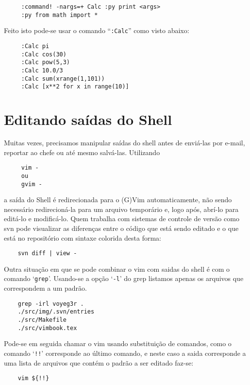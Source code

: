 \begin{verbatim}
     :command! -nargs=+ Calc :py print <args>
     :py from math import *
\end{verbatim}

Feito isto pode-se usar o comando ``{\tt :Calc}'' como visto abaixo:

\begin{verbatim}
     :Calc pi
     :Calc cos(30)
     :Calc pow(5,3)
     :Calc 10.0/3
     :Calc sum(xrange(1,101))
     :Calc [x**2 for x in range(10)] 
\end{verbatim}

\section{Editando saídas do Shell}
\label{sec:Editando saídas do Shell}

Muitas vezes, precisamos manipular saídas do shell antes de enviá-las por e-mail, reportar ao chefe ou até mesmo 
salvá-las. Utilizando

\begin{verbatim}
     vim -
     ou
     gvim -
\end{verbatim}

a saída do Shell é redirecionada para o (G)Vim automaticamente, não sendo
necessário redirecioná-la para um arquivo temporário e, logo após, abrí-lo para
editá-lo e modificá-lo. Quem trabalha com sistemas de controle de versão como svn 
pode visualizar as diferenças entre o código que está sendo editado e o que 
está no repositório com sintaxe colorida desta forma:

\begin{verbatim}
    svn diff | view -
\end{verbatim}

Outra situação em que se pode combinar o vim com saidas do shell é com o
comando `\verb|grep|'. Usando-se a opção `\verb|-l|' do grep listamos apenas os
arquivos que correspondem a um padrão.

\begin{verbatim}
    grep -irl voyeg3r .
    ./src/img/.svn/entries
    ./src/Makefile
    ./src/vimbook.tex
\end{verbatim}

Pode-se em seguida chamar o vim usando substituição de comandos, como o comando
`\verb|!!|' corresponde ao último comando, e neste caso a saida corresponde a
uma lista de arquivos que contém o padrão a ser editado faz-se:

\begin{verbatim}
    vim ${!!}
\end{verbatim}

